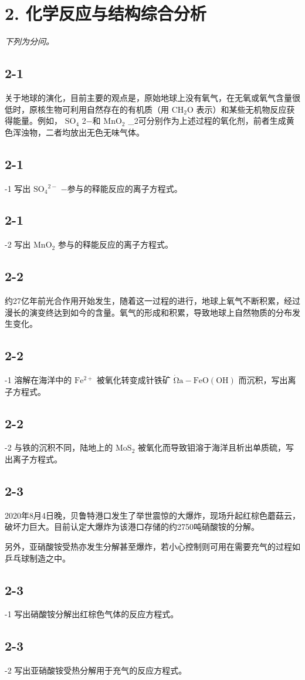 \section*{2. 化学反应与结构综合分析}
\textit{下列为分问。}

\subsection*{2-1}
关于地球的演化，⽬前主要的观点是，原始地球上没有氧⽓，在⽆氧或氧⽓含量很低时，原核⽣物可利⽤⾃然存在的有机质（⽤ $\mathrm { C H _ { 2 } O }$ 表⽰）和某些⽆机物反应获得能量。例如， $\mathrm { S O } _ { 4 }$ 2−和 $\mathrm { M n O _ { 2 } }$ _{2}可分别作为上述过程的氧化剂，前者⽣成⻩⾊浑浊物，⼆者均放出⽆⾊⽆味⽓体。

\subsection*{2-1}
-1 写出 $\mathrm { S O } _ { 4 } { } ^ { 2 - }$ −参与的释能反应的离⼦⽅程式。

\subsection*{2-1}
-2 写出 $\mathrm { M n O _ { 2 } }$ 参与的释能反应的离⼦⽅程式。

\subsection*{2-2}
约27亿年前光合作⽤开始发⽣，随着这⼀过程的进⾏，地球上氧⽓不断积累，经过漫⻓的演变终达到如今的含量。氧⽓的形成和积累，导致地球上⾃然物质的分布发⽣变化。

\subsection*{2-2}
-1 溶解在海洋中的 $\mathrm { F e ^ { 2 + } }$ 被氧化转变成针铁矿 $\mathrm { \dot { \Omega } a - F e O ( O H ) }$ ⽽沉积，写出离⼦⽅程式。

\subsection*{2-2}
-2 与铁的沉积不同，陆地上的 $\mathrm { M o S } _ { 2 }$ 被氧化⽽导致钼溶于海洋且析出单质硫，写出离⼦⽅程式。

\subsection*{2-3}
2020年8⽉4⽇晚，⻉鲁特港⼝发⽣了举世震惊的⼤爆炸，现场升起红棕⾊蘑菇云，破坏⼒巨⼤。⽬前认定⼤爆炸为该港⼝存储的约2750吨硝酸铵的分解。

另外，亚硝酸铵受热亦发⽣分解甚⾄爆炸，若⼩⼼控制则可⽤在需要充⽓的过程如乒乓球制造之中。

\subsection*{2-3}
-1 写出硝酸铵分解出红棕⾊⽓体的反应⽅程式。

\subsection*{2-3}
-2 写出亚硝酸铵受热分解⽤于充⽓的反应⽅程式。
